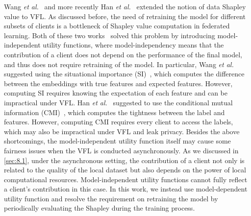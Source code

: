 Wang \textit{et al.}~\cite{wang2019measure} and more recently Han \textit{et al.}~\cite{han2021data} extended the notion of data Shapley value to VFL. As discussed before, the need of retraining the model for different subsets of clients is a bottleneck of Shapley value computation in federated learning. Both of these two works~\cite{wang2019measure,han2021data} solved this problem by introducing model-independent utility functions, where model-independency means that the contribution of a client does not depend on the performance of the final model, and thus does not require retraining of the model. In particular, Wang \textit{et al.}~\cite{wang2019measure} suggested using the situational importance (SI)~\cite{achen1982interpreting}, which computes the difference between the embeddings with true features and expected features. However, computing SI requires knowing the expectation of each feature and can be impractical under VFL. Han \textit{et al.}~\cite{han2021data} suggested to use the conditional mutual information (CMI)~\cite{brown2012conditional}, which computes the tightness between the label and features. However, computing CMI requires every client to access the labels, which may also be impractical under VFL and leak privacy. Besides the above shortcomings, the model-independent utility function itself may cause some fairness issues when the VFL is conducted asynchronously. As we discussed in \autoref{sec:8.1}, under the asynchronous setting, the contribution of a client not only is related to the quality of the local dataset but also depends on the power of local computational resources. Model-independent utility functions cannot fully reflect a client's contribution in this case. In this work, we instead use model-dependent utility function and resolve the requirement on retraining the model by periodically evaluating the Shapley during the training process.

